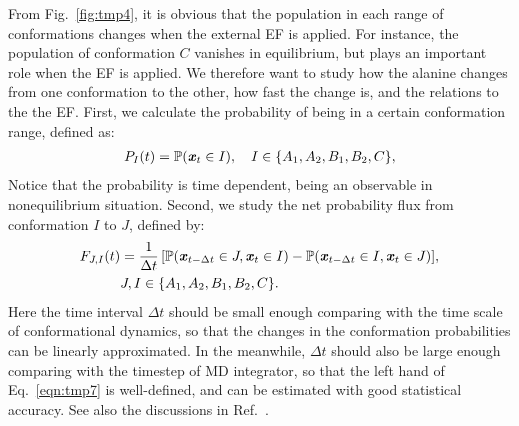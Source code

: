 \documentclass[a4paper,preprint,unsortedaddress,onecolumn]{revtex4-1}
\newcommand{\vect}[1]{\textbf{\textit{#1}}}
\newcommand{\fwd}[0]{\textrm{fwd}}
\newcommand{\bwd}[0]{\textrm{bwd}}
\begin{document}
From Fig.~\ref{fig:tmp4}, it is obvious that the population in each
range of conformations changes when the external EF is applied.
For instance, the population of conformation $C$ vanishes in equilibrium,
but plays an important role when the EF is applied. We
therefore want to study how the alanine changes from one conformation
to the other, how fast the change is, and the relations to the 
the EF. 
First, we calculate the probability of being in a certain conformation range,
defined as:
\begin{align}
  P_I(t) = \mathbb P (\vect x_t \in I), \quad  I \in \{A_1, A_2, B_1, B_2, C\},
\end{align}
Notice that the probability is time dependent, being an observable in nonequilibrium situation.
Second,
we study the net probability flux from conformation $I$ to $J$, defined by:
\begin{align}\nonumber
  F_{J,I}(t) & = \frac1{\Delta t}\, [\mathbb P( \vect x_{t-\Delta t} \in J, \vect x_t \in I) - \mathbb P( \vect x_{t-\Delta t} \in I, \vect x_t \in J)], \\\label{eqn:tmp7}
  & J,I \in \{A_1, A_2, B_1, B_2, C\}.
\end{align}
Here the time interval $\Delta t$ should be small enough comparing with the
time scale of conformational dynamics,
so that the changes in the conformation probabilities
can be linearly approximated.
In the meanwhile,  $\Delta t$ should also be  large enough comparing with
the timestep of MD integrator, 
so that the left hand of Eq.~\eqref{eqn:tmp7} is well-defined, and can be
estimated with good statistical accuracy.
See also the discussions in Ref.~\cite{schuette2011markov}.
\end{document}
